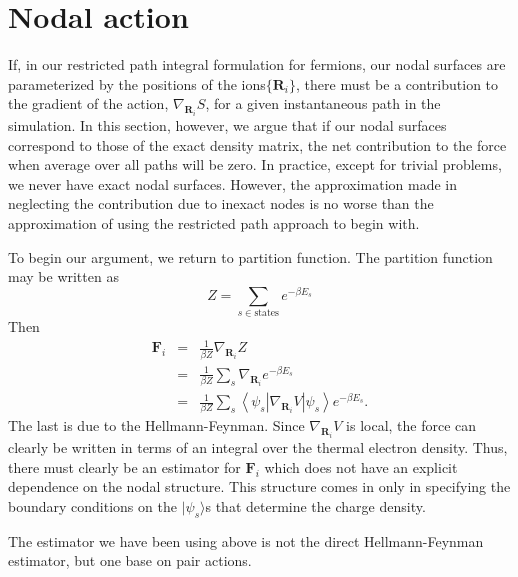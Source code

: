 \documentclass{article}
\newcommand{\vR}{\mathbf{R}}
\newcommand{\vF}{\mathbf{F}}
\begin{document}
\section{Nodal action}
If, in our restricted path integral formulation for fermions, our
nodal surfaces are parameterized by the positions of the
ions$\{\vR_i\}$, there must be a contribution to the gradient of the
action, $\nabla_{\vR_i} S$, for a given instantaneous path in the
simulation.  In this section, however, we argue that if our nodal
surfaces correspond to those of the exact density matrix, the net
contribution to the force when average over all paths will be zero.
In practice, except for trivial problems, we never have exact nodal
surfaces.  However, the approximation made in neglecting the
contribution due to inexact nodes is no worse than the approximation
of using the restricted path approach to begin with.

To begin our argument, we return to partition function.  The partition
function may be written as
\begin{equation}
Z = \sum_{s\in \text{states}} e^{-\beta E_s}
\end{equation}
Then
\begin{eqnarray}
\vF_i & = & \frac{1}{\beta Z} \nabla_{\vR_i} Z \\
      & = & \frac{1}{\beta Z} \sum_s \nabla_{\vR_i} e^{-\beta E_s} \\
      & = & \frac{1}{\beta Z} \sum_s \left\langle \psi_s |
      \nabla_{\vR_i} V | \psi_s \right \rangle e^{-\beta E_s}.
\end{eqnarray}
The last is due to the Hellmann-Feynman.  
Since $\nabla_{\vR_i} V$ is local, the force can clearly be written in
terms of an integral over the thermal electron density.  Thus, there
must clearly be an estimator for $\vF_i$ which does not have an
explicit dependence on the nodal structure.  This structure comes in
only in specifying the boundary conditions on the $|\psi_s\rangle$s
that determine the charge density.

The estimator we have been using above is not the direct
Hellmann-Feynman estimator, but one base on pair actions.
\end{document}
